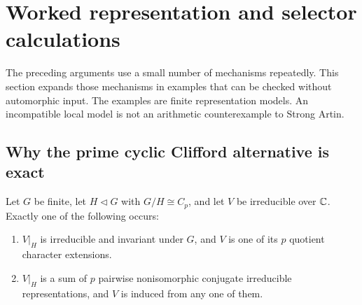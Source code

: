 \section{Worked representation and selector calculations}\label{sec:worked_calculations}

The preceding arguments use a small number of mechanisms repeatedly. This section expands those mechanisms in examples that can be checked without automorphic input. The examples are finite representation models. An incompatible local model is not an arithmetic counterexample to Strong Artin.

\subsection{Why the prime cyclic Clifford alternative is exact}

\begin{proposition}\label{prop:worked_clifford}
Let \(G\) be finite, let \(H\triangleleft G\) with \(G/H\cong C_p\), and let \(V\) be irreducible over \(\mathbb C\). Exactly one of the following occurs:
\begin{enumerate}
\item \(V|_H\) is irreducible and invariant under \(G\), and \(V\) is one of its \(p\) quotient character extensions.
\item \(V|_H\) is a sum of \(p\) pairwise nonisomorphic conjugate irreducible representations, and \(V\) is induced from any one of them.
\end{enumerate}
\end{proposition}

